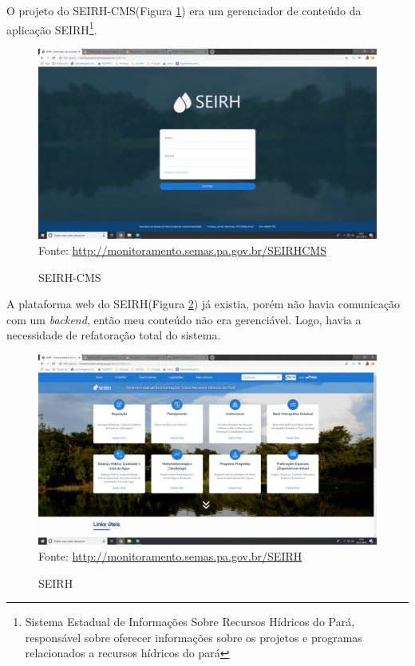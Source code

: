 O projeto do SEIRH-CMS(Figura \ref{fig:seirhCms}) era um gerenciador de conteúdo da aplicação SEIRH\footnote{Sistema Estadual de Informações Sobre Recursos Hídricos do Pará, responsável sobre oferecer informações sobre os projetos e programas relacionados a recursos hídricos do pará}.
\begin{figure}[H]
\centering
\caption{SEIRH-CMS} %
\includegraphics[scale=0.22]{SEIRH-CMS}\\  %
{\small Fonte: \url{http://monitoramento.semas.pa.gov.br/SEIRHCMS}} %
\label{fig:seirhCms} %
\end{figure}
A plataforma web do SEIRH(Figura \ref{fig:seirh}) já existia, porém não havia comunicação com um \textit{backend}, então meu conteúdo não era gerenciável. Logo, havia a necessidade de refatoração total do sistema.

\begin{figure}[H]
\centering
\caption{SEIRH} %
\includegraphics[scale=0.22]{SEIRH}\\  %
{\small Fonte: \url{http://monitoramento.semas.pa.gov.br/SEIRH}} %
\label{fig:seirh} %
\end{figure}

